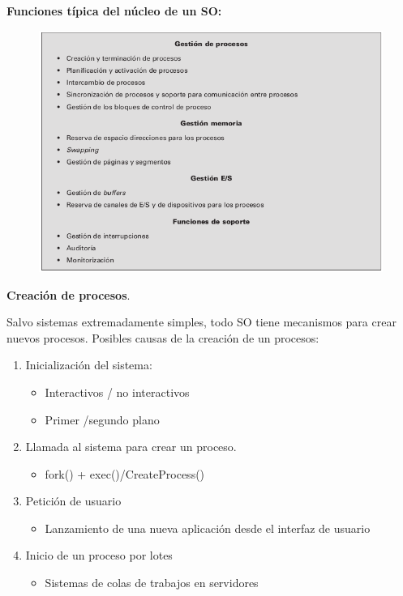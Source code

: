 \documentclass{article}
\begin{document}
\newpage
\textbf{Funciones típica del núcleo de un SO:}
\begin{figure}[h]
\centering
\includegraphics[scale=1, width=\textwidth]{kernel.png}
\end{figure}

\textbf{Creación de procesos}.

Salvo sistemas extremadamente simples, todo SO tiene mecanismos para crear nuevos procesos. Posibles causas de la creación de un procesos: 
\begin{enumerate}
\item Inicialización del sistema:
	\begin{itemize}
	\item Interactivos / no interactivos
	
	\item Primer /segundo plano
	\end{itemize}
	
\item Llamada al sistema para crear un proceso.
	\begin{itemize}
	\item fork() + exec()/CreateProcess()
	\end{itemize}
	
\item Petición de usuario
	\begin{itemize}
	\item Lanzamiento de una nueva aplicación desde el interfaz de usuario
	\end{itemize}
	
\item Inicio de un proceso por lotes
	\begin{itemize}
	\item Sistemas de colas de trabajos en servidores
	\end{itemize}
\end{enumerate}
\end{document}
